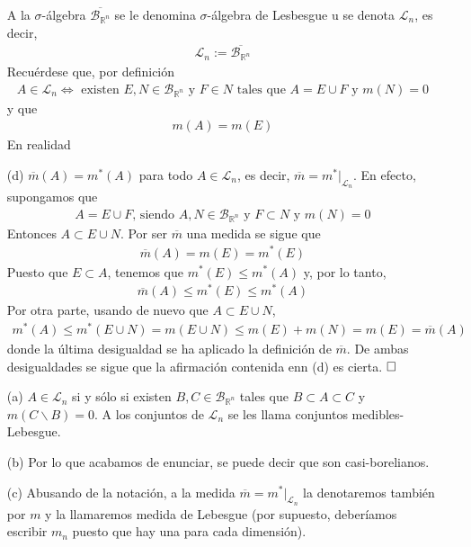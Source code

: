 \begin{enumerate}
          A la $\sigma$-álgebra $\overline{\mathcal{B}_{\mathbb{R}^n}}$ se le denomina $\sigma$-álgebra de Lesbesgue u se denota $\mathcal{L}_n$, es decir,
          \begin{align*}
              \mathcal{L}_n := \overline{\mathcal{B}_{\mathbb{R}^n}}
          \end{align*}
          Recuérdese que, por definición
          \begin{align*}
              A \in \mathcal{L}_n \Longleftrightarrow \text{ existen } E, N \in \mathcal{B}_{\mathbb{R}^n} \text{ y } F \in N \text{ tales que } A = E \cup F \text{ y } m(N) = 0
          \end{align*}
          y que
          \begin{align*}
              m(A) = m(E)
          \end{align*}
          En realidad
    \item[(d)] $\overline{m}(A) = m^*(A)$ para todo $A \in \mathcal{L}_n$, es decir, $\overline{m} = m^*|_{\mathcal{L}_n}$. En efecto, supongamos que
          \begin{align*}
              A = E \cup F \text{, siendo } A,N \in \mathcal{B}_{\mathbb{R}^n} \text{ y } F \subset N \text{ y } m(N) = 0
          \end{align*}
          Entonces $A \subset E \cup N$. Por ser $\overline{m}$ una medida se sigue que
          \begin{align*}
              \overline{m}(A) = m(E) = m^*(E)
          \end{align*}
          Puesto que $E \subset A$, tenemos que $m^*(E) \leq m^*(A)$ y, por lo tanto,
          \begin{align*}
              \overline{m}(A) \leq m^*(E) \leq m^*(A)
          \end{align*}
          Por otra parte, usando de nuevo que $A \subset E \cup N$,
          \begin{align*}
              m^*(A) \leq m^*(E \cup N) = m(E \cup N) \leq m(E) + m(N) = m(E) = \overline{m}(A)
          \end{align*}
          donde la última desigualdad se ha aplicado la definición de $\overline{m}$. De ambas desigualdades se sigue que la afirmación contenida enn (d) es cierta.
          $\hfill{\square}$
\end{enumerate}
\begin{obs}
    \begin{enumerate}
        \item[(a)] $A \in \mathcal{L}_n$ si y sólo si existen $B, C \in \mathcal{B}_{\mathbb{R}^n}$ tales que $B \subset A \subset C$ y $m(C \backslash B) = 0$. A los conjuntos de $\mathcal{L}_n$ se les llama conjuntos medibles-Lebesgue.
        \item[(b)] Por lo que acabamos de enunciar, se puede decir que son casi-borelianos.
        \item[(c)] Abusando de la notación, a la medida $\overline{m} = m^*|_{\mathcal{L}_n}$ la denotaremos también por $m$ y la llamaremos medida de Lebesgue (por supuesto, deberíamos escribir $m_n$ puesto que hay una para cada dimensión).
    \end{enumerate}
\end{obs}